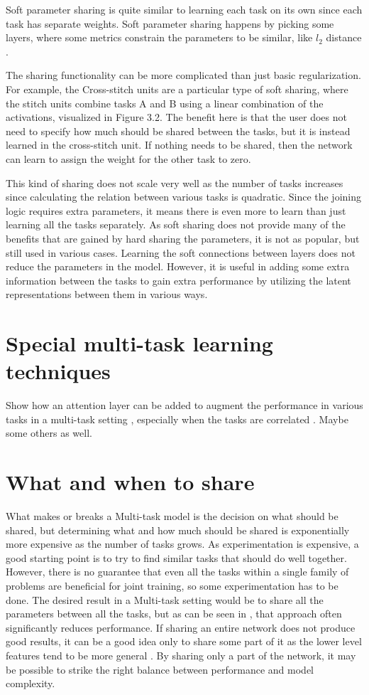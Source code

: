 Soft parameter sharing is quite similar to learning each task on its own since each task has separate weights.
Soft parameter sharing happens by picking some layers, where some metrics constrain the parameters to be similar, like ${l_2}$ distance \citep{ruderOverview}.

The sharing functionality can be more complicated than just basic regularization.
For example, the Cross-stitch units \citep{crossStitch} are a particular type of soft sharing, where the stitch units combine tasks A and B using a linear combination of the activations, visualized in Figure 3.2.
The benefit here is that the user does not need to specify how much should be shared between the tasks, but it is instead learned in the cross-stitch unit.
If nothing needs to be shared, then the network can learn to assign the weight for the other task to zero.

This kind of sharing does not scale very well as the number of tasks increases since calculating the relation between various tasks is quadratic.
Since the joining logic requires extra parameters, it means there is even more to learn than just learning all the tasks separately.
As soft sharing does not provide many of the benefits that are gained by hard sharing the parameters, it is not as popular, but still used in various cases.
Learning the soft connections between layers does not reduce the parameters in the model.
However, it is useful in adding some extra information between the tasks to gain extra performance by utilizing the latent representations between them in various ways.

\section{Special multi-task learning techniques}
Show how an attention layer can be added to augment the performance in various tasks in a multi-task setting \citep{multiTaskAttention}, especially when the tasks are correlated \citep{multiTaskWeather} \citep{weatherNet}. Maybe some others as well.

\section{What and when to share}
What makes or breaks a Multi-task model is the decision on what should be shared, but determining what and how much should be shared is exponentially more expensive as the number of tasks grows.
As experimentation is expensive, a good starting point is to try to find similar tasks that should do well together.
However, there is no guarantee that even all the tasks within a single family of problems are beneficial for joint training, so some experimentation has to be done.
The desired result in a Multi-task setting would be to share all the parameters between all the tasks, but as can be seen in \citep{uberNet}, that approach often significantly reduces performance.
If sharing an entire network does not produce good results, it can be a good idea only to share some part of it as the lower level features tend to be more general \citep{transferringMidLevelRepresentations}.
By sharing only a part of the network, it may be possible to strike the right balance between performance and model complexity.

